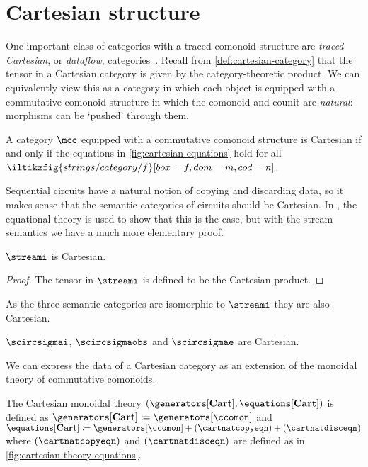 \section{Cartesian structure}\label{sec:cartesian-structure}

One important class of categories with a traced comonoid structure are
\emph{traced Cartesian}, or \emph{dataflow},
categories~\cite{cazanescu1990new}.
Recall from \cref{def:cartesian-category} that the tensor in a Cartesian
category is given by the category-theoretic product.
We can equivalently view this as a category in which each object is equipped
with a commutative comonoid structure in which the comonoid and counit are
\emph{natural}: morphisms can be `pushed' through them.

\begin{theorem}
    A category \(\mcc\) equipped with a commutative comonoid structure is
    Cartesian if and only if the equations in \cref{fig:cartesian-equations}
    hold for all \(\iltikzfig{strings/category/f}[box=f,dom=m,cod=n]\).
\end{theorem}



Sequential circuits have a natural notion of copying and discarding data, so it
makes sense that the semantic categories of circuits should be Cartesian.
In \cite{ghica2016categorical}, the equational theory is used to show that this
is the case, but with the stream semantics we have a much more elementary proof.

\begin{theorem}
    \(\streami\) is Cartesian.
\end{theorem}
\begin{proof}
    The tensor in \(\streami\) is defined to be the Cartesian product.
\end{proof}

As the three semantic categories are isomorphic to \(\streami\) they are also
Cartesian.

\begin{corollary}
    \(\scircsigmai\), \(\scircsigmaobs\) and \(\scircsigmae\) are Cartesian.
\end{corollary}

We can express the data of a Cartesian category as an extension of the
monoidal theory of commutative comonoids.

\begin{definition}
    The Cartesian monoidal theory \(
    (\generators[\mathbf{Cart}], \equations[\mathbf{Cart}])
    \) is defined as \(
    \generators[\mathbf{Cart}] \coloneqq \generators[\ccomon]
    \) and \(
    \equations[\mathbf{Cart}]
    \coloneqq
    \generators[\ccomon] + (\cartnatcopyeqn) + (\cartnatdisceqn)
    \) where \((\cartnatcopyeqn)\) and \((\cartnatdisceqn)\) are defined as in
    \cref{fig:cartesian-theory-equations}.
\end{definition}

